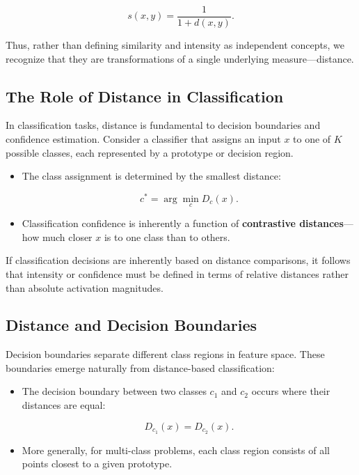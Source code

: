 \[
s(x, y) = \frac{1}{1 + d(x, y)}.
\]

Thus, rather than defining similarity and intensity as independent concepts, we recognize that they are transformations of a single underlying measure—distance.

\subsection{The Role of Distance in Classification}

In classification tasks, distance is fundamental to decision boundaries and confidence estimation. Consider a classifier that assigns an input \( x \) to one of \( K \) possible classes, each represented by a prototype or decision region.

\begin{itemize}
    \item The class assignment is determined by the smallest distance:
    
    \[
    c^* = \arg\min_{c} D_c(x).
    \]

    \item Classification confidence is inherently a function of \textbf{contrastive distances}—how much closer \( x \) is to one class than to others.

\end{itemize}

If classification decisions are inherently based on distance comparisons, it follows that intensity or confidence must be defined in terms of relative distances rather than absolute activation magnitudes.

\subsection{Distance and Decision Boundaries}

Decision boundaries separate different class regions in feature space. These boundaries emerge naturally from distance-based classification:

\begin{itemize}
    \item The decision boundary between two classes \( c_1 \) and \( c_2 \) occurs where their distances are equal:

    \[
    D_{c_1}(x) = D_{c_2}(x).
    \]

    \item More generally, for multi-class problems, each class region consists of all points closest to a given prototype.
\end{itemize}


